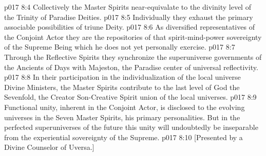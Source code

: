 \vs p017 8:4 \bibnobreakspace Collectively the Master Spirits near\hyp{}equivalate to the divinity level of the Trinity of Paradise Deities.
\vs p017 8:5 \bibnobreakspace Individually they exhaust the primary associable possibilities of triune Deity.
\vs p017 8:6 \bibnobreakspace As diversified representatives of the Conjoint Actor they are the repositories of that spirit\hyp{}mind\hyp{}power sovereignty of the Supreme Being which he does not yet personally exercise.
\vs p017 8:7 \bibnobreakspace Through the Reflective Spirits they synchronize the superuniverse governments of the Ancients of Days with Majeston, the Paradise center of universal reflectivity.
\vs p017 8:8 \bibnobreakspace In their participation in the individualization of the local universe Divine Ministers, the Master Spirits contribute to the last level of God the Sevenfold, the Creator Son\hyp{}Creative Spirit union of the local universes.
\vs p017 8:9 \pc Functional unity, inherent in the Conjoint Actor, is disclosed to the evolving universes in the Seven Master Spirits, his primary personalities. But in the perfected superuniverses of the future this unity will undoubtedly be inseparable from the experiential sovereignty of the Supreme.
\vsetoff
\vs p017 8:10 [Presented by a Divine Counselor of Uversa.]
